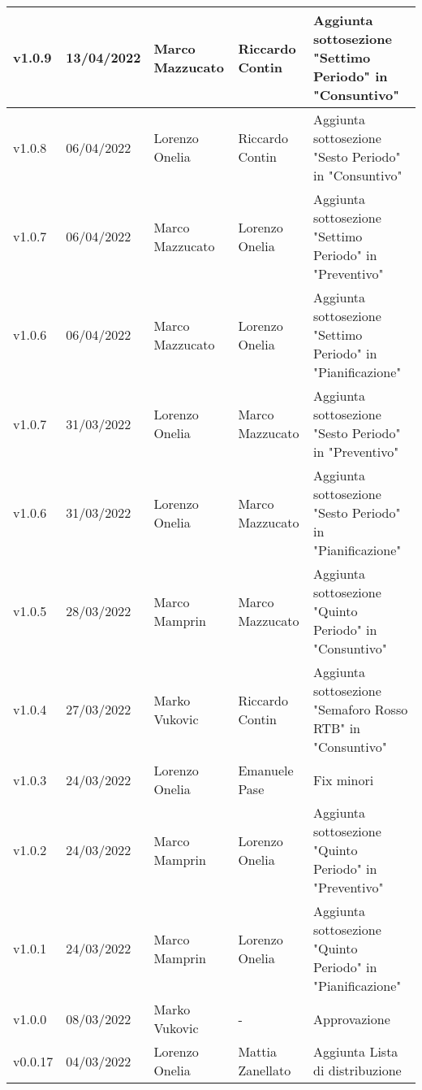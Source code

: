 {\begin{longtable}{|C{1.8cm}|C{2.1cm}|C{2cm}|C{2.4cm}|L{4.4cm}|}
  v1.0.9        & 13/04/2022    & Marco Mazzucato   &  Riccardo Contin   & Aggiunta sottosezione "Settimo Periodo" in "Consuntivo" \\ \hline
  v1.0.8        & 06/04/2022    & Lorenzo Onelia   &  Riccardo Contin    & Aggiunta sottosezione "Sesto Periodo" in "Consuntivo" \\ \hline
  v1.0.7        & 06/04/2022    & Marco Mazzucato   &   Lorenzo Onelia   & Aggiunta sottosezione "Settimo Periodo" in "Preventivo" \\ \hline
  v1.0.6        & 06/04/2022    & Marco Mazzucato   &  Lorenzo Onelia    & Aggiunta sottosezione "Settimo Periodo" in "Pianificazione" \\ \hline
  v1.0.7        & 31/03/2022    & Lorenzo Onelia   &  Marco Mazzucato    & Aggiunta sottosezione "Sesto Periodo" in "Preventivo" \\ \hline
  v1.0.6        & 31/03/2022    & Lorenzo Onelia   &   Marco Mazzucato   & Aggiunta sottosezione "Sesto Periodo" in "Pianificazione" \\ \hline
  v1.0.5        & 28/03/2022    & Marco Mamprin   &  Marco Mazzucato    & Aggiunta sottosezione "Quinto Periodo" in "Consuntivo" \\ \hline
  v1.0.4        & 27/03/2022    & Marko Vukovic   &  Riccardo Contin    & Aggiunta sottosezione "Semaforo Rosso RTB" in "Consuntivo" \\ \hline
  v1.0.3        & 24/03/2022    & Lorenzo Onelia  & Emanuele Pase    & Fix minori                  \\ \hline
  v1.0.2        & 24/03/2022    & Marco Mamprin   &  Lorenzo Onelia    & Aggiunta sottosezione "Quinto Periodo" in "Preventivo" \\ \hline
  v1.0.1        & 24/03/2022    & Marco Mamprin   &  Lorenzo Onelia    & Aggiunta sottosezione "Quinto Periodo" in "Pianificazione" \\ \hline
  v1.0.0        & 08/03/2022    & Marko Vukovic   &  -                 & Approvazione \\ \hline
  v0.0.17       & 04/03/2022    & Lorenzo Onelia  & Mattia Zanellato     & Aggiunta Lista di distribuzione                  \\ \hline

\end{longtable}}
